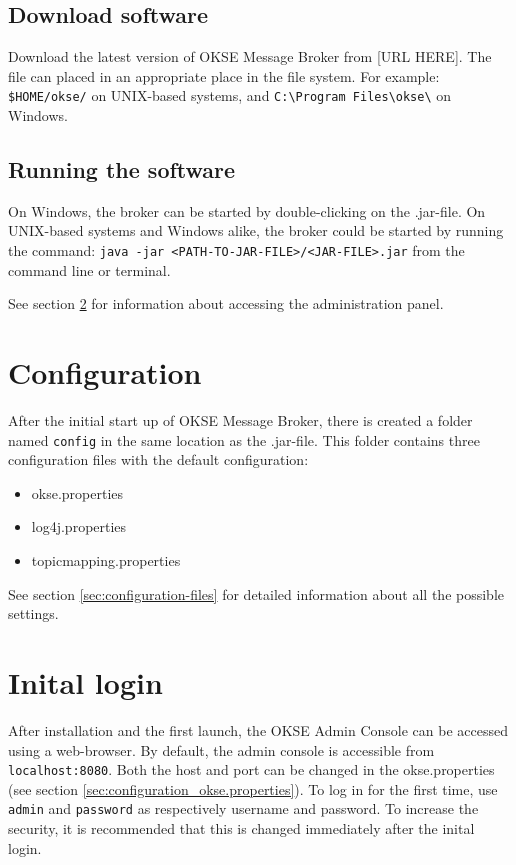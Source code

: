 \subsection{Download software}

Download the latest version of OKSE Message Broker from [URL HERE].
The file can placed in an appropriate place in the file system. For example: \verb!$HOME/okse/! on UNIX-based systems, and \verb!C:\Program Files\okse\! on Windows.

\subsection{Running the software}

On Windows, the broker can be started by double-clicking on the .jar-file. On UNIX-based systems and Windows alike, the broker could be started by running the command: \verb!java -jar <PATH-TO-JAR-FILE>/<JAR-FILE>.jar! from the command line or terminal.

See section \ref{sec:inital-login} for information about accessing the administration panel.

\section{Configuration}

After the initial start up of OKSE Message Broker, there is created a folder named \verb!config! in the same location as the .jar-file. This folder contains three configuration files with the default configuration:

\begin{itemize}
\setlength{\itemsep}{0cm}%
\item okse.properties
\item log4j.properties
\item topicmapping.properties
\end{itemize}

\noindent See section \ref{sec:configuration-files} for detailed information about all the possible settings.

\section{Inital login}
\label{sec:inital-login}

After installation and the first launch, the OKSE Admin Console can be accessed using a web-browser. By default, the admin console is accessible from \verb!localhost:8080!. Both the host and port can be changed in the okse.properties (see section \ref{sec:configuration_okse.properties}). To log in for the first time, use \verb!admin! and \verb!password! as respectively username and password. To increase the security, it is recommended that this is changed immediately after the inital login. 

